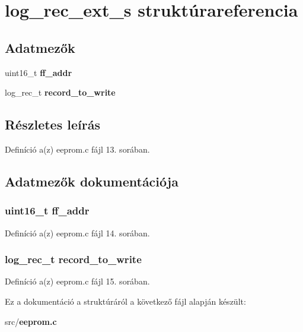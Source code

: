 \section{log\-\_\-rec\-\_\-ext\-\_\-s struktúrareferencia}
\label{structlog__rec__ext__s}
\subsection*{Adatmezők}
\begin{DoxyCompactItemize}
\item 
uint16\-\_\-t {\bf ff\-\_\-addr}
\item 
log\-\_\-rec\-\_\-t {\bf record\-\_\-to\-\_\-write}
\end{DoxyCompactItemize}


\subsection{Részletes leírás}


Definíció a(z) eeprom.\-c fájl 13. sorában.



\subsection{Adatmezők dokumentációja}
\subsubsection[{ff\-\_\-addr}]{\setlength{\rightskip}{0pt plus 5cm}uint16\-\_\-t ff\-\_\-addr}\label{structlog__rec__ext__s_a18264237eda76d12ba51a07955e06844}


Definíció a(z) eeprom.\-c fájl 14. sorában.

\subsubsection[{record\-\_\-to\-\_\-write}]{\setlength{\rightskip}{0pt plus 5cm}log\-\_\-rec\-\_\-t record\-\_\-to\-\_\-write}\label{structlog__rec__ext__s_a3c90f7ced121dbf41d1654e740a4939d}


Definíció a(z) eeprom.\-c fájl 15. sorában.



Ez a dokumentáció a struktúráról a következő fájl alapján készült\-:\begin{DoxyCompactItemize}
\item 
src/{\bf eeprom.\-c}\end{DoxyCompactItemize}

